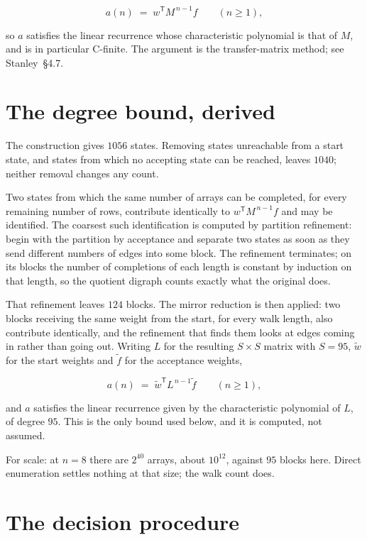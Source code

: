\documentclass[11pt]{article}
\theoremstyle{definition}
\begin{document}
\[a(n) \;=\; w^{\mathsf T} M^{\,n-1} f \qquad (n \ge 1),\]

so $a$ satisfies the linear recurrence whose characteristic polynomial is that of $M$, and is in particular C-finite. The argument is the transfer-matrix method; see Stanley~\S4.7.

\section{The degree bound, derived}

The construction gives $1056$ states. Removing states unreachable from a start state, and states from which no accepting state can be reached, leaves $1040$; neither removal changes any count.

Two states from which the same number of arrays can be completed, for every remaining number of rows, contribute identically to $w^{\mathsf T}M^{\,n-1}f$ and may be identified. The coarsest such identification is computed by partition refinement: begin with the partition by acceptance and separate two states as soon as they send different numbers of edges into some block. The refinement terminates; on its blocks the number of completions of each length is constant by induction on that length, so the quotient digraph counts exactly what the original does.

That refinement leaves $124$ blocks. The mirror reduction is then applied: two blocks receiving the same weight from the start, for every walk length, also contribute identically, and the refinement that finds them looks at edges coming in rather than going out. Writing $L$ for the resulting $S \times S$ matrix with $S = 95$, $\tilde w$ for the start weights and $\tilde f$ for the acceptance weights,

\[a(n) \;=\; \tilde w^{\mathsf T} L^{\,n-1} \tilde f \qquad (n \ge 1),\]

and $a$ satisfies the linear recurrence given by the characteristic polynomial of $L$, of degree $95$. This is the only bound used below, and it is computed, not assumed.

For scale: at $n = 8$ there are $2^{40}$ arrays, about $10^{12}$, against $95$ blocks here. Direct enumeration settles nothing at that size; the walk count does.

\section{The decision procedure}
\end{document}

